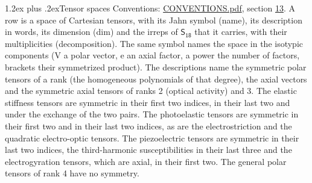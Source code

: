 \documentclass[10pt,a4paper]{article}
\makeatletter
\renewcommand\section{\@startsection{section}{1}{\z@}{-3ex plus -1ex minus -.2ex}%
  {1.2ex plus .2ex}{\normalfont\large\sffamily\bfseries\color{parttitle}}}
\numberwithin{equation}{section}
\newcommand{\grp}[1]{\mathsf{#1}}
\makeatother
\begin{document}
\section{Tensor spaces}\label{s:tensor_spaces}
Conventions: \href{../../CONVENTIONS.pdf}{CONVENTIONS.pdf}, section \href{../../CONVENTIONS.pdf\#conv.13}{13}.
\leavevmode\label{n:head.name}\label{n:head.description}\label{n:head.dim}\label{n:head.decomposition}A row is a space of Cartesian tensors, with its Jahn symbol (name), its description in words, its dimension (dim) and the irreps of $\grp{S_{18}}$ that it carries, with their multiplicities (decomposition). \label{n:label.jahn}The same symbol names the space in the isotypic components (V a polar vector, e an axial factor, a power the number of factors, brackets their symmetrized product). The descriptions name the symmetric polar tensors of a rank (the homogeneous polynomials of that degree), the axial vectors and the symmetric axial tensors of ranks 2 (optical activity) and 3. The elastic stiffness tensors are symmetric in their first two indices, in their last two and under the exchange of the two pairs. The photoelastic tensors are symmetric in their first two and in their last two indices, as are the electrostriction and the quadratic electro-optic tensors. The piezoelectric tensors are symmetric in their last two indices, the third-harmonic susceptibilities in their last three and the electrogyration tensors, which are axial, in their first two. The general polar tensors of rank 4 have no symmetry.
\end{document}

